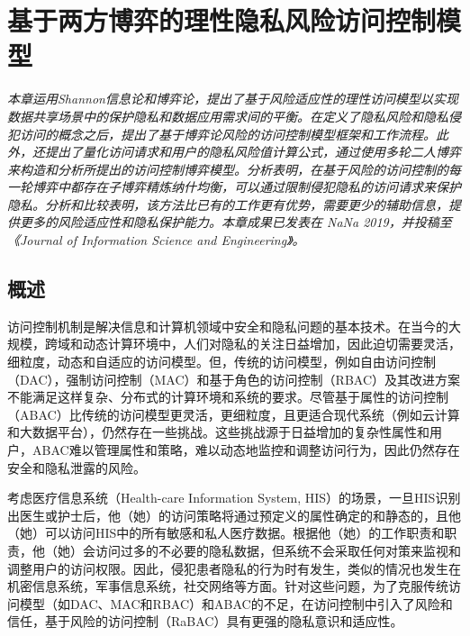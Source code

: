 \chapter{基于两方博弈的理性隐私风险访问控制模型}
\label{chap:game-theoretical-RaBAC-for-privacy}

\textit{}

\textit{本章运用Shannon信息论和博弈论，提出了基于风险适应性的理性访问模型以实现数据共享场景中的保护隐私和数据应用需求间的平衡。在定义了隐私风险和隐私侵犯访问的概念之后，提出了基于博弈论风险的访问控制模型框架和工作流程。此外，还提出了量化访问请求和用户的隐私风险值计算公式，通过使用多轮二人博弈来构造和分析所提出的访问控制博弈模型。分析表明，在基于风险的访问控制的每一轮博弈中都存在子博弈精炼纳什均衡，可以通过限制侵犯隐私的访问请求来保护隐私。分析和比较表明，该方法比已有的工作更有优势，需要更少的辅助信息，提供更多的风险适应性和隐私保护能力。本章成果已发表在 NaNa 2019，并投稿至《Journal of Information Science and Engineering》。}

\section{概述}

访问控制机制是解决信息和计算机领域中安全和隐私问题的基本技术。在当今的大规模，跨域和动态计算环境中，人们对隐私的关注日益增加，因此迫切需要灵活，细粒度，动态和自适应的访问模型。但，传统的访问模型，例如自由访问控制（DAC）\cite{lampson1974protection}，强制访问控制（MAC）\cite{bell1973secure}和基于角色的访问控制（RBAC）\cite{sandhu1996role}及其改进方案不能满足这样复杂、分布式的计算环境和系统的要求。尽管基于属性的访问控制（ABAC）\cite{kuhn2010adding}比传统的访问模型更灵活，更细粒度，且更适合现代系统（例如云计算和大数据平台），仍然存在一些挑战\cite{servos2017current,paci2018survey}。这些挑战源于日益增加的复杂性属性和用户，ABAC难以管理属性和策略，难以动态地监控和调整访问行为，因此仍然存在安全和隐私泄露的风险。

考虑医疗信息系统（Health-care Information System, HIS）的场景，一旦HIS识别出医生或护士后，他（她）的访问策略将通过预定义的属性确定的和静态的，且他（她）可以访问HIS中的所有敏感和私人医疗数据。根据他（她）的工作职责和职责，他（她）会访问过多的不必要的隐私数据，但系统不会采取任何对策来监视和调整用户的访问权限。因此，侵犯患者隐私的行为时有发生，类似的情况也发生在机密信息系统，军事信息系统，社交网络等方面。针对这些问题，为了克服传统访问模型（如DAC、MAC和RBAC）和ABAC的不足，在访问控制中引入了风险\cite{cheng2007fuzzy, zhang2018privacy}和信任\cite{dimmock2004using, pustchi2015mt}，基于风险的访问控制（RaBAC）\cite{cheng2007fuzzy}具有更强的隐私意识和适应性\cite{ni2010risk, wang2011quantified, zhang2018privacy}。


